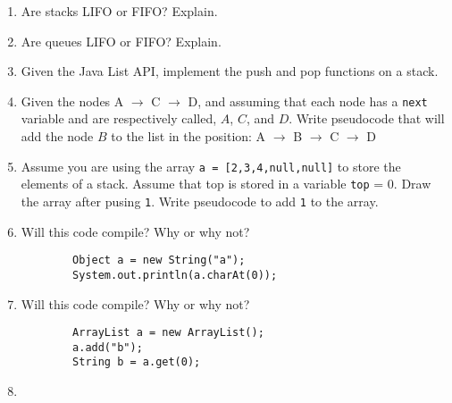 \documentclass{article}
\begin{document}
\begin{enumerate}
	\item Are stacks LIFO or FIFO? Explain.
	\item Are queues LIFO or FIFO? Explain.
	\item Given the Java List API, implement the push and pop functions on
	a stack.
	\item Given the nodes A $\rightarrow$ C $\rightarrow$ D, and assuming
	that each node has a \texttt{next} variable and are respectively
	called, $A$, $C$, and $D$. Write pseudocode that will add the node $B$
	to the list in the position: A $\rightarrow$ B $\rightarrow$ C
	$\rightarrow$ D
	\item Assume you are using the array \texttt{a = [2,3,4,null,null]} to
	store the elements of a stack. Assume that top is stored in a variable
	\texttt{top} = 0. 
	Draw the array after pusing \texttt{1}.
	Write pseudocode to add \texttt{1} to the array.
	\item Will this code compile? Why or why not?
	\begin{verbatim}
		Object a = new String("a");
		System.out.println(a.charAt(0));
	\end{verbatim}
	\item Will this code compile? Why or why not?
	\begin{verbatim}
		ArrayList a = new ArrayList();
		a.add("b");
		String b = a.get(0);
	\end{verbatim}
\item 

\end{enumerate}
\end{document}
